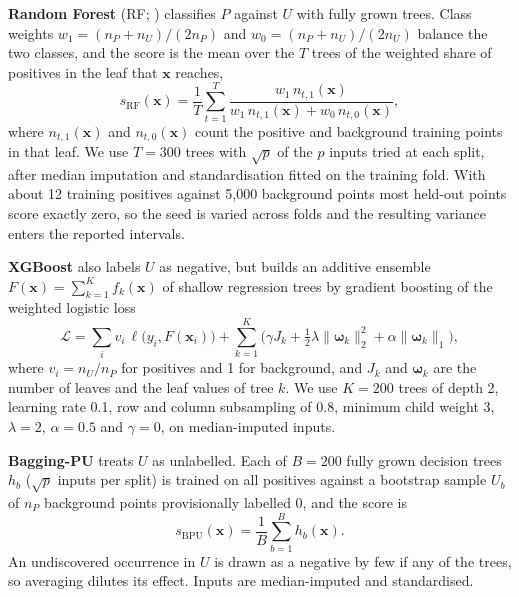 \documentclass[pdflatex,sn-apa]{sn-jnl}
\begin{document}
\textbf{Random Forest} (RF; \citealp{Breiman2001}) classifies $P$ against $U$ with fully grown trees. Class weights $w_1 = (n_P + n_U)/(2n_P)$ and $w_0 = (n_P + n_U)/(2n_U)$ balance the two classes, and the score is the mean over the $T$ trees of the weighted share of positives in the leaf that $\mathbf{x}$ reaches,
\begin{equation}
s_{\mathrm{RF}}(\mathbf{x}) = \frac{1}{T}\sum_{t=1}^{T} \frac{w_1\, n_{t,1}(\mathbf{x})}{w_1\, n_{t,1}(\mathbf{x}) + w_0\, n_{t,0}(\mathbf{x})},
\end{equation}
where $n_{t,1}(\mathbf{x})$ and $n_{t,0}(\mathbf{x})$ count the positive and background training points in that leaf. We use $T = 300$ trees with $\sqrt{p}$ of the $p$ inputs tried at each split, after median imputation and standardisation fitted on the training fold. With about 12 training positives against 5,000 background points most held-out points score exactly zero, so the seed is varied across folds and the resulting variance enters the reported intervals.

\textbf{XGBoost} \citep{Chen2016} also labels $U$ as negative, but builds an additive ensemble $F(\mathbf{x}) = \sum_{k=1}^{K} f_k(\mathbf{x})$ of shallow regression trees by gradient boosting of the weighted logistic loss
\begin{equation}
\mathcal{L} = \sum_{i} v_i\, \ell\big(y_i, F(\mathbf{x}_i)\big) + \sum_{k=1}^{K}\Big(\gamma J_k + \tfrac{1}{2}\lambda \lVert \boldsymbol{\omega}_k \rVert_2^2 + \alpha \lVert \boldsymbol{\omega}_k \rVert_1\Big),
\end{equation}
where $v_i = n_U/n_P$ for positives and 1 for background, and $J_k$ and $\boldsymbol{\omega}_k$ are the number of leaves and the leaf values of tree $k$. We use $K = 200$ trees of depth 2, learning rate 0.1, row and column subsampling of 0.8, minimum child weight 3, $\lambda = 2$, $\alpha = 0.5$ and $\gamma = 0$, on median-imputed inputs.

\textbf{Bagging-PU} \citep{Mordelet2014} treats $U$ as unlabelled. Each of $B = 200$ fully grown decision trees $h_b$ ($\sqrt{p}$ inputs per split) is trained on all positives against a bootstrap sample $U_b$ of $n_P$ background points provisionally labelled 0, and the score is
\begin{equation}
s_{\mathrm{BPU}}(\mathbf{x}) = \frac{1}{B}\sum_{b=1}^{B} h_b(\mathbf{x}).
\end{equation}
An undiscovered occurrence in $U$ is drawn as a negative by few if any of the trees, so averaging dilutes its effect. Inputs are median-imputed and standardised.
\end{document}
